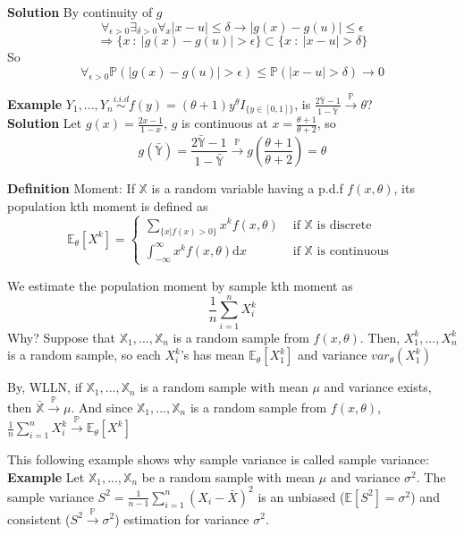 \textbf{Solution} By continuity of $g$
$$\forall_{\epsilon > 0} \exists_{\delta>0} \forall_{x} |x-u|\leq\delta \to |g(x)-g(u)|\leq \epsilon$$
$$\Rightarrow \{ x\ : \ |g(x)-g(u)| > \epsilon \} \subset \{ x\ : \ |x-u|> \delta \}$$
So
$$\forall_{\epsilon > 0} \mathbb{P}( |g(x)-g(u)| > \epsilon ) \leq \mathbb{P}( |x-u|> \delta ) \to 0$$

\textbf{Example} $Y_1, ..., Y_n \overset{i.i.d}{\sim} f(y) = (\theta+1)y^\theta I_{\{y\in[0,1]\}}$, is $\frac{2\bar{\mathbb{Y}}-1}{1-\bar{\mathbb{Y}}} \overset{\mathbb{P}}{\to} \theta$?\\

\textbf{Solution} Let $g(x) = \frac{2x-1}{1-x}$, $g$ is continuous at $x = \frac{\theta+1}{\theta+2}$, so $$g(\bar{\mathbb{Y}}) = \frac{2\bar{\mathbb{Y}}-1}{1-\bar{\mathbb{Y}}} \overset{\mathbb{P}}{\to} g(\frac{\theta+1}{\theta+2}) = \theta$$

\textbf{Definition} Moment: If $\mathbb{X}$ is a random variable having a p.d.f $f(x, \theta)$, its population kth moment is defined as\\
$$\mathbb{E}_\theta[X^k] = 
\begin{cases}
\sum_{\{x|f(x) > 0\}} x^k f(x, \theta) & \text{ if } \mathbb{X} \text{ is discrete }\\
\int_{-\infty}^\infty x^k f(x, \theta) \mathrm{d}x & \text{ if } \mathbb{X} \text{ is continuous }
\end{cases}$$

We estimate the population moment by sample kth moment as $$\frac{1}{n}\sum_{i=1}^n X_i^k$$
Why? Suppose that $\mathbb{X}_1, ..., \mathbb{X}_n$ is a random sample from $f(x, \theta)$. Then, $X_1^k, ..., X_n^k$ is a random sample, so each $X_i^k$'s has mean $\mathbb{E}_\theta[X_1^k]$ and variance $var_\theta( X_1^k )$

By, WLLN, if $\mathbb{X}_1, ..., \mathbb{X}_n$ is a random sample with mean $\mu$ and variance exists, then $\bar{\mathbb{X}} \overset{\mathbb{P}}{\to} \mu$. And since $\mathbb{X}_1, ..., \mathbb{X}_n$ is a random sample from $f(x, \theta)$, $\frac{1}{n}\sum_{i=1}^n X_i^k \overset{\mathbb{P}}{\to} \mathbb{E}_\theta[X^k]$

This following example shows why sample variance is called sample variance:\\

\textbf{Example} Let $\mathbb{X}_1, ..., \mathbb{X}_n$ be a random sample with mean $\mu$ and variance $\sigma^2$. The sample variance $S^2 = \frac{1}{n-1}\sum_{i=1}^n (X_i-\bar{X})^2$ is an unbiased ($\mathbb{E}[S^2] = \sigma^2$) and consistent ($S^2 \overset{\mathbb{P}}{\to} \sigma^2$) estimation for variance $\sigma^2$.\\


